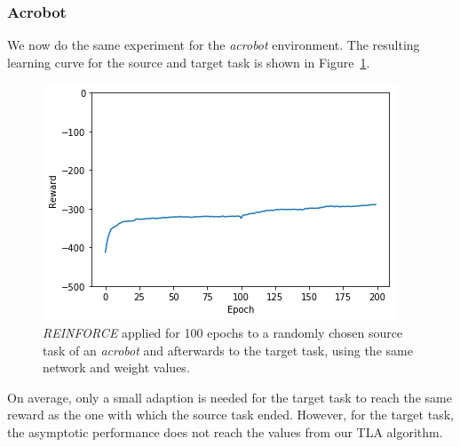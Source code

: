 \subsubsection{Acrobot} %
\label{ssub:reinforce_source_target:acrobot}
We now do the same experiment for the \textit{acrobot} environment. The resulting learning curve for the source and target task is shown in Figure~\ref{fig:acrobot:reward_reinforce_2tasks}.
\begin{figure}[htb]
    \centering
    \includegraphics[width=.8\linewidth]{images/results/Acrobot/reinforce_2tasks.png}
    \caption{\textit{REINFORCE} applied for 100 epochs to a randomly chosen source task of an \textit{acrobot} and afterwards to the target task, using the same network and weight values.}
    \label{fig:acrobot:reward_reinforce_2tasks}
\end{figure}
On average, only a small adaption is needed for the target task to reach the same reward as the one with which the source task ended. However, for the target task, the asymptotic performance does not reach the values from our TLA algorithm.

